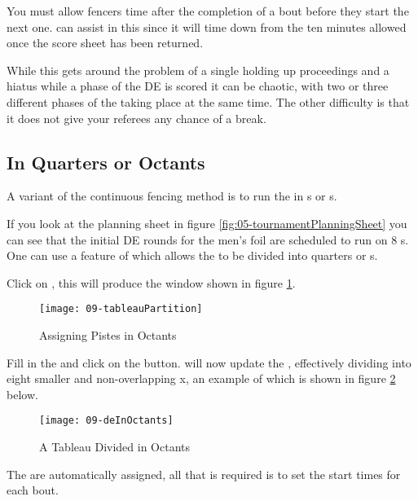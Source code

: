 \documentclass[a4paper,11pt]{memoir}
\begin{document}
You must allow fencers time after the completion of a bout before they start the next one. \fencingtime{} can assist in this since it will time down from the ten minutes allowed once the score sheet has been returned.

While this gets around the problem of a single  holding up proceedings and a hiatus while a phase of the DE is scored it can be chaotic, with two or three different phases of the  taking place at the same time. The other difficulty is that it does not give your referees any chance of a break.

\subsection{In Quarters or Octants}

A variant of the continuous fencing method is to run the  in s or s. 

If you look at the planning sheet in figure \ref{fig:05-tournamentPlanningSheet} you can see that the initial DE rounds for the men's foil are scheduled to run on 8 s. One can use a feature of \fencingtime{} which allows the  to be divided into quarters or s. 

Click on , this will produce the window shown in figure \ref{fig:09-tableauPartition}.

\begin{figure}[!ht]
 \centering
 \texttt{[image: 09-tableauPartition]}
 \caption{Assigning Pistes in Octants} \label{fig:09-tableauPartition}
\end{figure}

Fill in the  and click on the  button. \fencingtime{} will now update the , effectively dividing into eight smaller and non-overlapping x, an example of which is shown in figure \ref{fig:09-deInOctants} below.

\begin{figure}[!ht]
 \centering
 \texttt{[image: 09-deInOctants]}
 \caption{A Tableau Divided in Octants} \label{fig:09-deInOctants}
\end{figure}

The  are automatically assigned, all that is required is to set the start times for each bout. 
\end{document}
